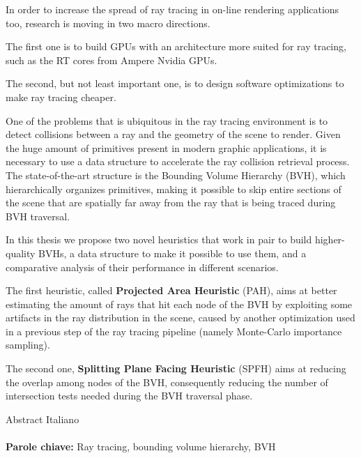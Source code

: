 \documentclass{PoliMi_MasterThesis}
\begin{document}
In order to increase the spread of ray tracing in on-line rendering applications too, research is moving in two macro directions.

The first one is to build GPUs with an architecture more suited for ray tracing, such as the RT cores from Ampere Nvidia GPUs.

The second, but not least important one, is to design software optimizations to make ray tracing cheaper.

One of the problems that is ubiquitous in the ray tracing environment is to detect collisions between a ray and the geometry of the scene to render. Given the huge amount of primitives present in modern graphic applications, it is necessary to use a data structure to accelerate the ray collision retrieval process. The state-of-the-art structure is the Bounding Volume Hierarchy (BVH), which hierarchically organizes primitives, making it possible to skip entire sections of the scene that are spatially far away from the ray that is being traced during BVH traversal.

In this thesis we propose two novel heuristics that work in pair to build higher-quality BVHs, a data structure to make it possible to use them, and a comparative analysis of their performance in different scenarios.

The first heuristic, called \textbf{Projected Area Heuristic} (PAH), aims at better estimating the amount of rays that hit each node of the BVH by exploiting some artifacts in the ray distribution in the scene, caused by another optimization used in a previous step of the ray tracing pipeline (namely Monte-Carlo importance sampling).

The second one, \textbf{Splitting Plane Facing Heuristic} (SPFH) aims at reducing the overlap among nodes of the BVH, consequently reducing the number of intersection tests needed during the BVH traversal phase.

\normalsize

\makeatletter
\let\savedchap\@makechapterhead
\def\@makechapterhead{\vspace*{-3cm}\savedchap}
\let\@makechapterhead\savedchap
\makeatletter
\small
Abstract Italiano
\\
\\
\textbf{Parole chiave:} Ray tracing, bounding volume hierarchy, BVH
\normalsize


\thispagestyle{empty}
\tableofcontents %
\thispagestyle{empty}
\cleardoublepage
\end{document}
